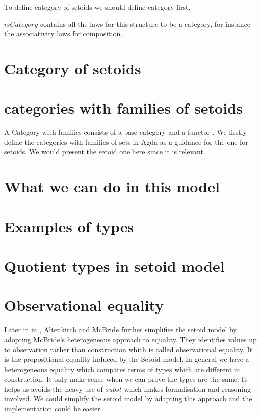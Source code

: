 To define category of setoids we should define category first.



$isCategory$ contains all the laws for this structure to be a category, for instance the
associativity laws for composition.

\section{Category of setoids}





\section{categories with families of setoids}


A Category with families consists of a base category and a functor
\cite{clairambault2005categories}. We firstly define the categories with
families of sets in Agda  as a guidance for the one for setoids. We
would present the setoid one here since it is relevant.



\section{What we can do in this model}

\section{Examples of types}









\section{Quotient types in setoid model}





\section{Observational equality}


Later in in \cite{alti:ott-conf}, Altenkirch and McBride further
simplifies the setoid model by adopting McBride's heterogeneous
approach to equality. They identifies values up to observation rather than
  construction which is called observational equality. It is the
  propositional equality induced by the Setoid model.  In general we have a heterogeneous equality which
  compares terms of types which are different in construction. It only
  make sense when we can prove the types are the same. It helps us
  avoids the heavy use of $subst$ which makes formalisation and
  reasoning involved. We could simplify the setoid model by adapting this
  approach and the implementation could be easier.
